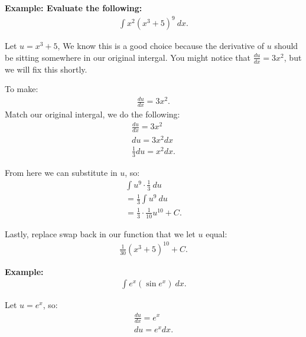 \documentclass{report}
\begin{document}
  \bigbreak \noindent 
  \begin{mdframed}
    \textbf{Example: Evaluate the following:}
    \begin{align*}
      \int x^{2}(x^{3}+5)^{9}\ dx
    .\end{align*}
  \end{mdframed}

  \bigbreak \noindent \bigbreak \noindent 
  Let $u= x^{3} +5$, We know this is a good choice because the derivative of $u$ should be sitting
  somewhere in our original intergal. You might notice that $\frac{du}{dx} = 3x^{2}$, but we will fix this shortly.

  \bigbreak \noindent \bigbreak \noindent
  To make:
  \begin{align*}
    \frac{du}{dx} = 3x^{2}
  .\end{align*}
  \bigbreak \noindent 
  Match our original intergal, we do the following:
  \begin{align*}
    \frac{du}{dx} = 3x^{2} \\
    du = 3x^{2}dx \\
    \frac{1}{3}du=x^{2}dx
  .\end{align*}

  \bigbreak \noindent \bigbreak \noindent 
  From here we can substitute in $u$, so:
  \begin{align*}
    \int u^{9} \cdot \frac{1}{3}\ du \\
    = \frac{1}{3}\int u^{9}\ du \\
    = \frac{1}{3} \cdot \frac{1}{10}u^{10} + C
  .\end{align*}

  \bigbreak \noindent \bigbreak \noindent 
  Lastly, replace swap back in our function that we let $u$ equal:
  \begin{align*}
    \boxed{\frac{1}{30}(x^{3} +5)^{10} + C}
  .\end{align*}

  \bigbreak \noindent 
  \begin{mdframed}
    \textbf{Example: }
    \begin{align*}
      \int e^{x}(\sin{e^{x}})\ dx
    .\end{align*}
  \end{mdframed}

  \bigbreak \noindent \bigbreak \noindent
  Let $u=e^{x}$, so:
  \begin{align*}
    \frac{du}{dx} = e^{x} \\
    du = e^{x}dx
  .\end{align*}
\end{document}
